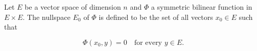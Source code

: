 Let $E$ be a vector space of dimension $n$ and $\Phi$ a symmetric bilinear function in $E \times E$. The nullspace $E_0$ of $\Phi$ is defined to be the set of all vectors $x_0 \in E$ such that

$$\Phi(x_0, y) = 0 \quad \text{for every } y \in E.$$
